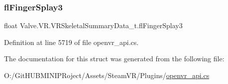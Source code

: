 \subsubsection{\texorpdfstring{flFingerSplay3}{flFingerSplay3}}
{\footnotesize\ttfamily float Valve.\+V\+R.\+V\+R\+Skeletal\+Summary\+Data\+\_\+t.\+fl\+Finger\+Splay3}



Definition at line 5719 of file openvr\+\_\+api.\+cs.



The documentation for this struct was generated from the following file\+:\begin{DoxyCompactItemize}
\item 
O\+:/\+Git\+H\+U\+B\+M\+I\+N\+I\+P\+Roject/\+Assets/\+Steam\+V\+R/\+Plugins/\mbox{\hyperlink{openvr__api_8cs}{openvr\+\_\+api.\+cs}}\end{DoxyCompactItemize}

